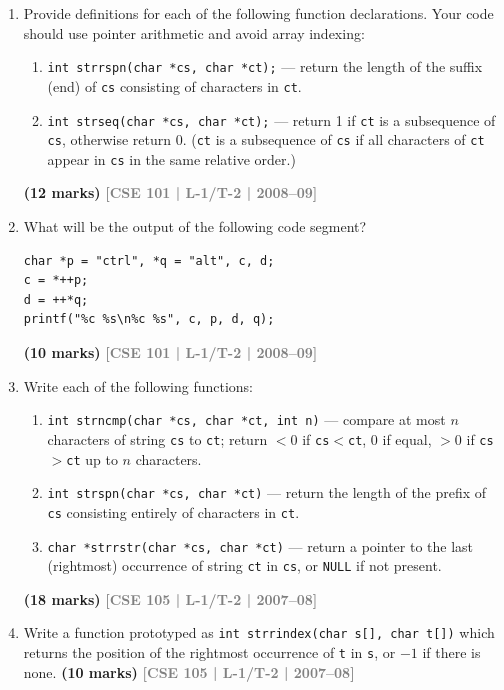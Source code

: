 \documentclass[12pt,a3paper]{article}
\newcommand{\yr}[1]{\hfill\textcolor{gray}{\small\textbf{[#1]}}}
\newcommand{\mk}[1]{\textcolor{orange!70!black}{\small\textbf{(#1 marks)}}}
\begin{document}
\begin{enumerate}
\item Provide definitions for each of the following function declarations. Your code should use pointer arithmetic and avoid array indexing:
\begin{enumerate}
  \item \texttt{int strrspn(char *cs, char *ct);} --- return the length of the suffix (end) of \texttt{cs} consisting of characters in \texttt{ct}.
  \item \texttt{int strseq(char *cs, char *ct);} --- return 1 if \texttt{ct} is a subsequence of \texttt{cs}, otherwise return 0. (\texttt{ct} is a subsequence of \texttt{cs} if all characters of \texttt{ct} appear in \texttt{cs} in the same relative order.)
\end{enumerate}
\mk{12} \yr{CSE 101 | L-1/T-2 | 2008--09}

\item What will be the output of the following code segment?
 
\begin{lstlisting}
char *p = "ctrl", *q = "alt", c, d;
c = *++p;
d = ++*q;
printf("%c %s\n%c %s", c, p, d, q);
\end{lstlisting}
\mk{10} \yr{CSE 101 | L-1/T-2 | 2008--09}

\item Write each of the following functions:
\begin{enumerate}
  \item \texttt{int strncmp(char *cs, char *ct, int n)} --- compare at most $n$ characters of string \texttt{cs} to \texttt{ct}; return $<0$ if \texttt{cs}$<$\texttt{ct}, $0$ if equal, $>0$ if \texttt{cs}$>$\texttt{ct} up to $n$ characters.
  \item \texttt{int strspn(char *cs, char *ct)} --- return the length of the prefix of \texttt{cs} consisting entirely of characters in \texttt{ct}.
  \item \texttt{char *strrstr(char *cs, char *ct)} --- return a pointer to the last (rightmost) occurrence of string \texttt{ct} in \texttt{cs}, or \texttt{NULL} if not present.
\end{enumerate}
\mk{18} \yr{CSE 105 | L-1/T-2 | 2007--08}

\item Write a function prototyped as \texttt{int strrindex(char s[], char t[])} which returns the position of the rightmost occurrence of \texttt{t} in \texttt{s}, or $-1$ if there is none.
\mk{10} \yr{CSE 105 | L-1/T-2 | 2007--08}


\end{enumerate}
\end{document}
